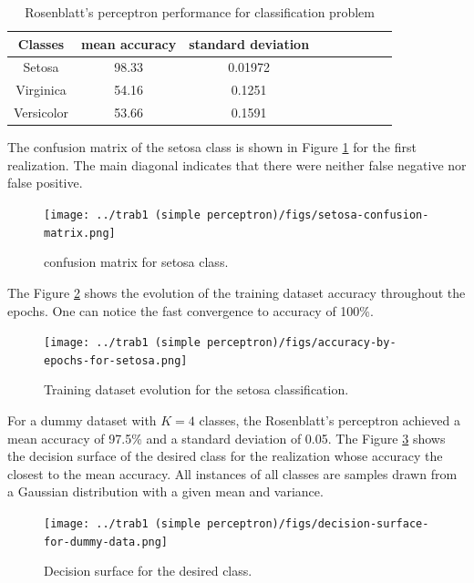 \documentclass[12pt,a4paper]{article}
\begin{document}
\begin{table}
	\centering
	\caption{Rosenblatt's perceptron performance for classification problem}
	\footnotesize
	\setlength{\tabcolsep}{5pt}
	\begin{tabular}{ccccccccc}
		\hline
		Classes & mean accuracy & standard deviation \\
		\hline
		Setosa & 98.33 & 0.01972 \\
        \hline
		Virginica & 54.16 & 0.1251 \\
		\hline
		Versicolor & 53.66 & 0.1591 \\
		\hline
	\end{tabular} \label{tab:rosenblatt-results}
\end{table}

The confusion matrix of the setosa class is shown in Figure \ref{fig:confusion-matrix-setosa} for the first realization. The main diagonal indicates that there were neither false negative nor false positive.

\begin{figure}[H]
    \centering
    \texttt{[image: ../trab1 (simple perceptron)/figs/setosa-confusion-matrix.png]}
    \caption{confusion matrix for setosa class.}
    \label{fig:confusion-matrix-setosa}
\end{figure}

The Figure \ref{fig:setosa-training-evolution} shows the evolution of the training dataset accuracy throughout the epochs. One can notice the fast convergence to accuracy of 100\%.

\begin{figure}[H]
    \centering
    \texttt{[image: ../trab1 (simple perceptron)/figs/accuracy-by-epochs-for-setosa.png]}
    \caption{Training dataset evolution for the setosa classification.}
    \label{fig:setosa-training-evolution}
\end{figure}

For a dummy dataset with \(K=4\) classes, the Rosenblatt's perceptron achieved a mean accuracy of 97.5\% and a standard deviation of 0.05. The Figure \ref{fig:decision-surface-dummy-data} shows the decision surface of the desired class for the realization whose accuracy the closest to the mean accuracy. All instances of all classes are samples drawn from a Gaussian distribution with a given mean and variance.

\begin{figure}[H]
    \centering
    \texttt{[image: ../trab1 (simple perceptron)/figs/decision-surface-for-dummy-data.png]}
    \caption{Decision surface for the desired class.}
    \label{fig:decision-surface-dummy-data}
\end{figure}
\end{document}
